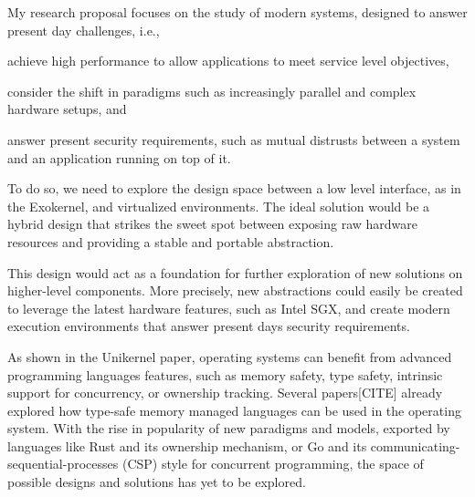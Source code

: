 % 
My research proposal focuses on the study of modern systems, designed to answer present day challenges, i.e.,
\begin{enumerate*}
	\item achieve high performance to allow applications to meet service level objectives,
	\item consider the shift in paradigms such as increasingly parallel and complex hardware setups, and
	\item answer present security requirements, such as mutual distrusts between a system and an application running on top of it.
\end{enumerate*}
To do so, we need to explore the design space between a low level interface, as in the Exokernel, and virtualized environments.
The ideal solution would be a hybrid design that strikes the sweet spot between exposing raw hardware resources and providing a stable and portable abstraction.

This design would act as a foundation for further exploration of new solutions on higher-level components. 
More precisely, new abstractions could easily be created to leverage the latest hardware features, such as Intel SGX, and create modern execution environments that answer present days security requirements.

As shown in the Unikernel paper, operating systems can benefit from advanced programming languages features, such as memory safety, type safety, intrinsic support for concurrency, or ownership tracking.
Several papers[CITE] already explored how type-safe memory managed languages can be used in the operating system.
With the rise in popularity of new paradigms and models, exported by languages like Rust and its ownership mechanism, or Go and its communicating-sequential-processes (CSP) style for concurrent programming, the space of possible designs and solutions has yet to be explored.






